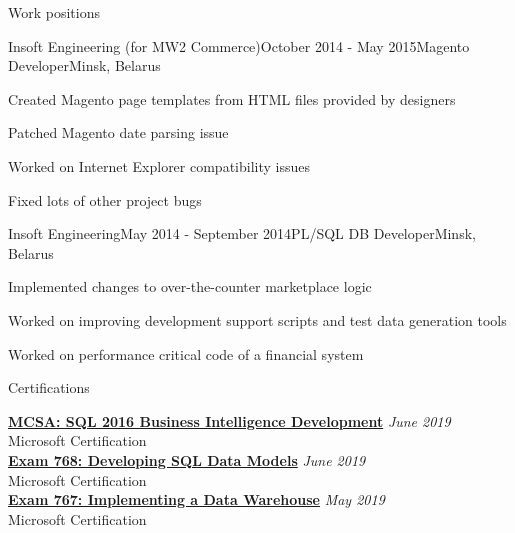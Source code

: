 \documentclass{resume} %
\begin{document}
\begin{rSection}{Work positions}
\begin{rSubsection}{Insoft Engineering (for MW2 Commerce)}{October 2014 - May 2015}{Magento Developer}{Minsk, Belarus}
\item Created Magento page templates from HTML files provided by designers
\item Patched Magento date parsing issue
\item Worked on Internet Explorer compatibility issues
\item Fixed lots of other project bugs
\end{rSubsection}

\begin{rSubsection}{Insoft Engineering}{May 2014 - September 2014}{PL/SQL DB Developer}{Minsk, Belarus}
\item Implemented changes to over-the-counter marketplace logic
\item Worked on improving development support scripts and test data generation tools
\item Worked on performance critical code of a financial system
\end{rSubsection}

\end{rSection}


\begin{rSection}{Certifications}

{\bf \href{https://www.youracclaim.com/badges/942bff46-1825-4cf0-8c1a-25221405a6cb}{MCSA: SQL 2016 Business Intelligence Development}} \hfill {\em June 2019} \\
Microsoft Certification \\

{\bf \href{https://www.youracclaim.com/badges/60b5faec-564d-4da6-a8c2-65762a36159e}{Exam 768: Developing SQL Data Models}} \hfill {\em June 2019} \\
Microsoft Certification \\

{\bf \href{https://www.youracclaim.com/badges/7405dcbe-59b0-42a4-804a-77c43f19341d}{Exam 767: Implementing a Data Warehouse}} \hfill {\em May 2019} \\
Microsoft Certification \\

\end{rSection}

\end{document}

